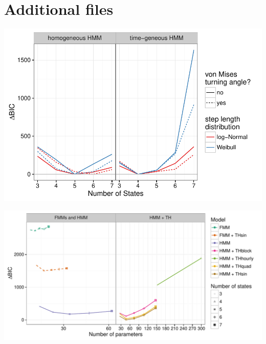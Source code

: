 \documentclass{article}\usepackage[]{graphicx}\usepackage{xcolor}
\makeatletter
\def\maxwidth{ %
  \ifdim\Gin@nat@width>\linewidth
    \linewidth
  \else
    \Gin@nat@width
  \fi
}
\newenvironment{knitrout}{}{} %
\makeatother
\begin{document}
\clearpage

\section{Additional files}


\begin{knitrout}
\color{fgcolor}
\includegraphics[width=\maxwidth]{figure/BICred_plot2-1} 

\end{knitrout}


\clearpage


\begin{knitrout}
\color{fgcolor}
\includegraphics[width=\maxwidth]{figure/adj_BIC_comparisons2-1} 

\end{knitrout}

\clearpage
\end{document}
